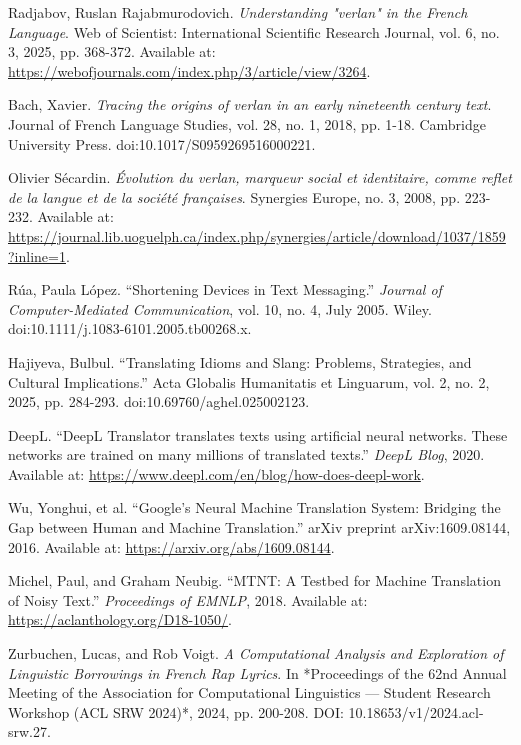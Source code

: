 \documentclass[12pt]{article}
\begin{document}
\begin{thebibliography}{9}

Radjabov, Ruslan Rajabmurodovich. \textit{Understanding "verlan" in the French Language}. 
Web of Scientist: International Scientific Research Journal, vol. 6, no. 3, 2025, pp. 368-372. 
Available at: \url{https://webofjournals.com/index.php/3/article/view/3264}.

Bach, Xavier. \textit{Tracing the origins of verlan in an early nineteenth century text}. 
Journal of French Language Studies, vol. 28, no. 1, 2018, pp. 1-18. 
Cambridge University Press. doi:10.1017/S0959269516000221.

Olivier Sécardin. \textit{Évolution du verlan, marqueur social et identitaire, comme reflet de la langue et de la société françaises}. 
Synergies Europe, no. 3, 2008, pp. 223-232. 
Available at: \url{https://journal.lib.uoguelph.ca/index.php/synergies/article/download/1037/1859?inline=1}.

Rúa, Paula López. “Shortening Devices in Text Messaging.” 
\textit{Journal of Computer-Mediated Communication}, vol. 10, no. 4, July 2005. 
Wiley. doi:10.1111/j.1083-6101.2005.tb00268.x.

Hajiyeva, Bulbul. “Translating Idioms and Slang: Problems, Strategies, and Cultural Implications.”  
Acta Globalis Humanitatis et Linguarum, vol. 2, no. 2, 2025, pp. 284-293. doi:10.69760/aghel.025002123.  

DeepL. “DeepL Translator translates texts using artificial neural networks. These networks are trained on many millions of translated texts.” 
\textit{DeepL Blog}, 2020. Available at: \url{https://www.deepl.com/en/blog/how-does-deepl-work}.

Wu, Yonghui, et al. “Google's Neural Machine Translation System: Bridging the Gap between Human and Machine Translation.” 
arXiv preprint arXiv:1609.08144, 2016. Available at: \url{https://arxiv.org/abs/1609.08144}.

Michel, Paul, and Graham Neubig. “MTNT: A Testbed for Machine Translation of Noisy Text.”
\textit{Proceedings of EMNLP}, 2018. Available at: \url{https://aclanthology.org/D18-1050/}.

Zurbuchen, Lucas, and Rob Voigt.  
\textit{A Computational Analysis and Exploration of Linguistic Borrowings in French Rap Lyrics}.  
In *Proceedings of the 62nd Annual Meeting of the Association for Computational Linguistics — Student Research Workshop (ACL SRW 2024)*, 2024, pp. 200-208.  
DOI: 10.18653/v1/2024.acl-srw.27.  


\end{thebibliography}
\end{document}
